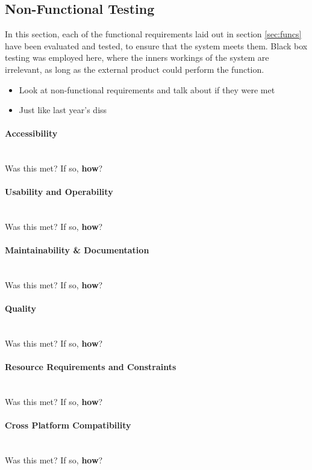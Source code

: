 \newpage 
\subsection{Non-Functional Testing}
In this section, each of the functional requirements laid out in section \ref{sec:funcs} have been evaluated and tested, to ensure that the system meets them. Black box testing\cite{beizer1995black} was employed here, where the inners workings of the system are irrelevant, as long as the external product could perform the function.
{\color{red}
	
	\begin{itemize}
		\item Look at non-functional requirements and talk about if they were met
		\item Just like last year's diss
	\end{itemize}
}
\paragraph{Accessibility}\ \\
{\color{red} Was this met? If so, \textbf{how}?}

\paragraph{Usability and Operability}\ \\
{\color{red} Was this met? If so, \textbf{how}?}

\paragraph{Maintainability \& Documentation}\ \\
{\color{red} Was this met? If so, \textbf{how}?}

\paragraph{Quality}\ \\
{\color{red} Was this met? If so, \textbf{how}?}

\paragraph{Resource Requirements and Constraints}\ \\
{\color{red} Was this met? If so, \textbf{how}?}

\paragraph{Cross Platform Compatibility}\ \\
{\color{red} Was this met? If so, \textbf{how}?}


